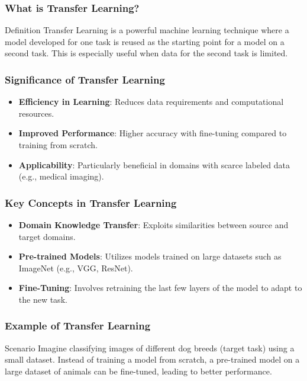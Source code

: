 \documentclass[aspectratio=169]{beamer}
\begin{document}
\begin{frame}[fragile]
  \frametitle{What is Transfer Learning?}
  \begin{block}{Definition}
    Transfer Learning is a powerful machine learning technique where a model developed for one task is reused as the starting point for a model on a second task. This is especially useful when data for the second task is limited.
  \end{block}
\end{frame}

\begin{frame}[fragile]
  \frametitle{Significance of Transfer Learning}
  \begin{itemize}
    \item \textbf{Efficiency in Learning}: Reduces data requirements and computational resources.
    \item \textbf{Improved Performance}: Higher accuracy with fine-tuning compared to training from scratch.
    \item \textbf{Applicability}: Particularly beneficial in domains with scarce labeled data (e.g., medical imaging).
  \end{itemize}
\end{frame}

\begin{frame}[fragile]
  \frametitle{Key Concepts in Transfer Learning}
  \begin{itemize}
    \item \textbf{Domain Knowledge Transfer}: Exploits similarities between source and target domains.
    \item \textbf{Pre-trained Models}: Utilizes models trained on large datasets such as ImageNet (e.g., VGG, ResNet).
    \item \textbf{Fine-Tuning}: Involves retraining the last few layers of the model to adapt to the new task.
  \end{itemize}
\end{frame}

\begin{frame}[fragile]
  \frametitle{Example of Transfer Learning}
  \begin{block}{Scenario}
    Imagine classifying images of different dog breeds (target task) using a small dataset. Instead of training a model from scratch, a pre-trained model on a large dataset of animals can be fine-tuned, leading to better performance.
  \end{block}
\end{frame}
\end{document}
